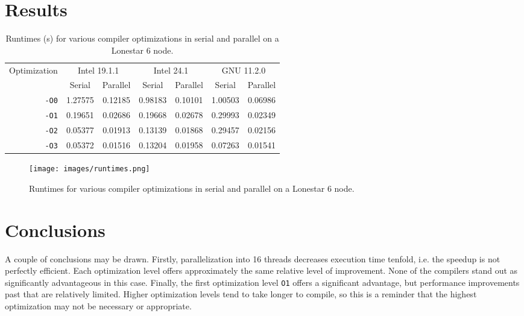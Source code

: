 \documentclass{article}
\begin{document}
\section{Results}

\begin{table}[h!]
	\centering
	\caption{Runtimes (s) for various compiler optimizations in serial and parallel on a Lonestar 6 node.}
	\label{tbl:comp-test}
	\begin{tabular}{r|cccccc}
		Optimization & \multicolumn{2}{c}{Intel 19.1.1} & \multicolumn{2}{c}{Intel 24.1} & \multicolumn{2}{c}{GNU 11.2.0} \\
		 & Serial & Parallel & Serial & Parallel & Serial & Parallel \\
		\hline
		\verb|-O0| & 1.27575 & 0.12185 & 0.98183 & 0.10101 & 1.00503 & 0.06986 \\
		\verb|-O1| & 0.19651 & 0.02686 & 0.19668 & 0.02678 & 0.29993 & 0.02349 \\
		\verb|-O2| & 0.05377 & 0.01913 & 0.13139 & 0.01868 & 0.29457 & 0.02156 \\
		\verb|-O3| & 0.05372 & 0.01516 & 0.13204 & 0.01958 & 0.07263 & 0.01541
	\end{tabular}
\end{table}

\begin{figure}[h!]
	\centering
	\texttt{[image: images/runtimes.png]}
	\caption{Runtimes for various compiler optimizations in serial and parallel on a Lonestar 6 node.}
	\label{fig:comp-test}
\end{figure}

\section{Conclusions}

A couple of conclusions may be drawn. Firstly, parallelization into 16 threads decreases execution time tenfold, i.e. the speedup is not perfectly efficient. Each optimization level offers approximately the same relative level of improvement. None of the compilers stand out as significantly advantageous in this case. Finally, the first optimization level \verb|O1| offers a significant advantage, but performance improvements past that are relatively limited. Higher optimization levels tend to take longer to compile, so this is a reminder that the highest optimization may not be necessary or appropriate.
\end{document}
